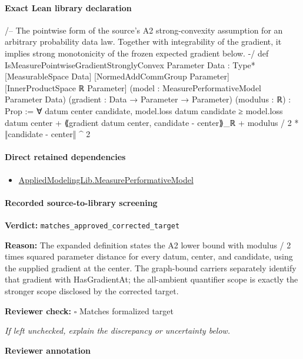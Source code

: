 \documentclass[10pt]{article}
\newcommand{\reviewerbox}{%
  \par\noindent\fbox{\parbox{0.96\linewidth}{\rule{0pt}{0.38in}}}\par
}
\newcommand{\reviewmatch}[1]{%
  \par\noindent\textbf{Reviewer check:} $\square$\; #1\par
  \noindent\emph{If left unchecked, explain the discrepancy or uncertainty below.}\par
}
\begin{document}
\paragraph{Exact Lean library declaration}
\begin{ReviewVerbatim}
/--
The pointwise form of the source's A2 strong-convexity assumption for an
arbitrary probability data law.  Together with integrability of the gradient,
it implies strong monotonicity of the frozen expected gradient below.
-/
def IsMeasurePointwiseGradientStronglyConvex {Parameter Data : Type*}
    [MeasurableSpace Data] [NormedAddCommGroup Parameter] [InnerProductSpace ℝ Parameter]
    (model : MeasurePerformativeModel Parameter Data)
    (gradient : Data → Parameter → Parameter) (modulus : ℝ) : Prop :=
  ∀ datum center candidate,
    model.loss datum candidate ≥
      model.loss datum center +
        ⟪gradient datum center, candidate - center⟫_ℝ +
          modulus / 2 * ‖candidate - center‖ ^ 2
\end{ReviewVerbatim}

\paragraph{Direct retained dependencies}
\begin{itemize}\raggedright
\item \hyperlink{library-prerequisite-96553d4fbb82f1ac}{Applied\allowbreak{}Modeling\allowbreak{}Lib.\allowbreak{}Measure\allowbreak{}Performative\allowbreak{}Model}
\end{itemize}
\paragraph{Recorded source-to-library screening}
\textbf{Verdict:} \texttt{matches\_approved\_corrected\_target}
\\
{\raggedright
\textbf{Reason:} The expanded definition states the A2 lower bound with modulus /\allowbreak{} 2 times squared parameter distance for every datum, center, and candidate, using the supplied gradient at the center.\allowbreak{} The graph-\allowbreak{}bound carriers separately identify that gradient with HasGradientAt;\allowbreak{} the all-\allowbreak{}ambient quantifier scope is exactly the stronger scope disclosed by the corrected target.\allowbreak{}
\par}
\reviewmatch{Matches formalized target}
\noindent\textbf{Reviewer annotation}\par
\reviewerbox
\clearpage
\hypertarget{library-prerequisite-3c6dd4ad7ac116e3}{}
\end{document}
